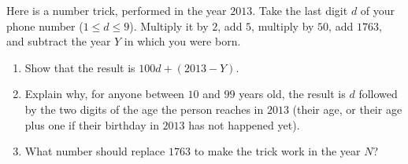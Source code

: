 Here is a number trick, performed in the year $2013$. Take the last digit $d$ of your phone number ($1\le d\le9$). Multiply it by $2$, add $5$, multiply by $50$, add $1763$, and subtract the year $Y$ in which you were born.
\begin{enumerate}
\item[(a)] Show that the result is $100d+(2013-Y)$.
\item[(b)] Explain why, for anyone between $10$ and $99$ years old, the result is $d$ followed by the two digits of the age the person reaches in $2013$ (their age, or their age plus one if their birthday in $2013$ has not happened yet).
\item[(c)] What number should replace $1763$ to make the trick work in the year $N$?
\end{enumerate}
